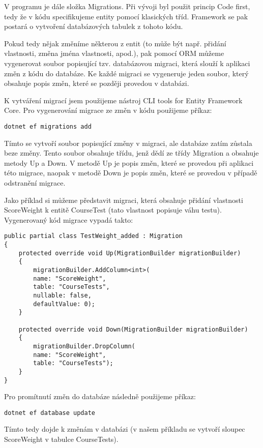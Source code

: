 V programu je dále složka Migrations. Při vývoji byl použit princip Code first, tedy že v kódu specifikujeme entity pomocí klasických tříd. Framework se pak postará o vytvoření databázových tabulek z tohoto kódu.

Pokud tedy nějak změníme některou z entit (to může být např. přidání vlastnosti, změna jména vlastnosti, apod.), pak pomocí ORM můžeme vygenerovat soubor popisující tzv. databázovou migraci, která slouží k aplikaci změn z kódu do databáze. Ke každé migraci se vygeneruje jeden soubor, který obsahuje popis změn, které se později provedou v databázi.

K vytváření migrací jsem použijeme nástroj CLI tools for Entity Framework Core. \cite{EfCoreCliDocs} Pro vygenerování migrace ze změn v kódu použijeme příkaz:

\begin{lstlisting}
dotnet ef migrations add 
\end{lstlisting}

Tímto se vytvoří soubor popisující změny v migraci, ale databáze zatím zůstala beze změny. Tento soubor obsahuje třídu, jenž dědí ze třídy Migration a obsahuje metody Up a Down. V metodě Up je popis změn, které se provedou při aplikaci této migrace, naopak v metodě Down je popis změn, které se provedou v případě odstranění migrace.

Jako příklad si můžeme představit migraci, která obsahuje přidání vlastnosti ScoreWeight k entitě CourseTest (tato vlastnost popisuje váhu testu).
Vygenerovaný kód migrace vypadá takto:

\begin{lstlisting}
public partial class TestWeight_added : Migration
{
	protected override void Up(MigrationBuilder migrationBuilder)
	{
		migrationBuilder.AddColumn<int>(
		name: "ScoreWeight",
		table: "CourseTests",
		nullable: false,
		defaultValue: 0);
	}
	
	protected override void Down(MigrationBuilder migrationBuilder)
	{
		migrationBuilder.DropColumn(
		name: "ScoreWeight",
		table: "CourseTests");
	}
}
\end{lstlisting}

Pro promítnutí změn do databáze následně použijeme příkaz:

\begin{lstlisting}
dotnet ef database update
\end{lstlisting}

Tímto tedy dojde k změnám v databázi (v našem příkladu se vytvoří sloupec ScoreWeight v tabulce CourseTests).

